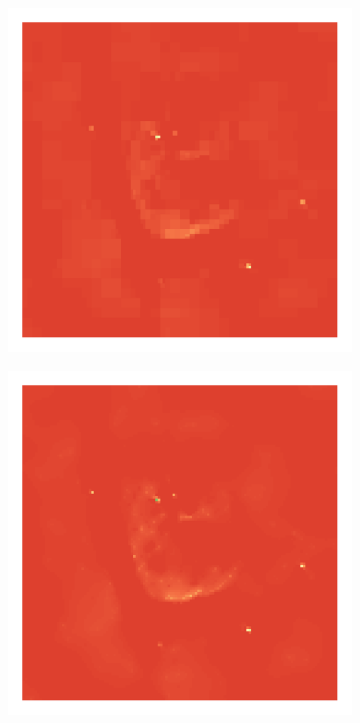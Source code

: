 \begin{figure}[h]
\begin{subfigure}[b]{0.24\linewidth}
	\end{subfigure}
	\begin{subfigure}[b]{0.24\linewidth}
		\includegraphics[width=\linewidth, trim={18px 19px 18px 18px}, clip]{./chapters/05.results/g55/haar_model.png}
	\end{subfigure}
	\begin{subfigure}[b]{0.24\linewidth}
		\includegraphics[width=\linewidth, trim={18px 19px 18px 18px}, clip]{./chapters/05.results/g55/starlets3_model.png}
	\end{subfigure}
\end{figure}

